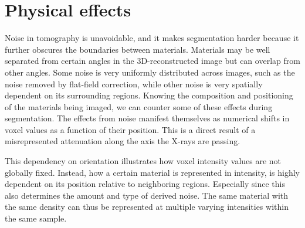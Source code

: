 \section{Physical effects}
\label{sec:physics}

Noise in tomography is unavoidable, and it makes segmentation harder because it
further obscures the boundaries between materials. Materials may be well
separated from certain angles in the 3D-reconstructed image but can overlap
from other angles. Some noise is very uniformly distributed across images, such
as the noise removed by flat-field correction, while other noise is very
spatially dependent on its surrounding regions. Knowing the composition and
positioning of the materials being imaged, we can counter some of these effects
during segmentation. The effects from noise manifest themselves as numerical
shifts in voxel values as a function of their position. This is a direct result
of a misrepresented attenuation along the axis the X-rays are passing.

This dependency on orientation illustrates how voxel intensity values are not
globally fixed. Instead, how a certain material is represented in intensity, is
highly dependent on its position relative to neighboring regions. Especially
since this also determines the amount and type of derived noise. The same
material with the same density can thus be represented at multiple varying
intensities within the same sample.

